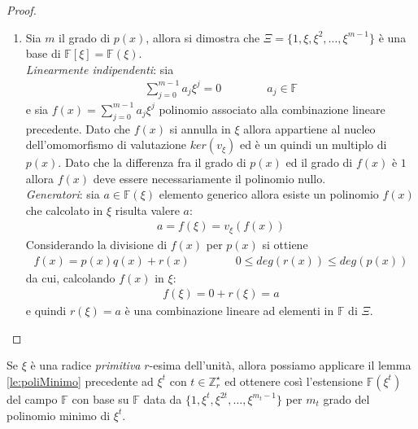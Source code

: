 \begin{proof}
\begin{enumerate}
      \item Sia $m$ il grado di $p(x)$, allora si dimostra che $\Xi = \lbrace1, \xi, \xi^2, \dots, \xi^{m-1} \rbrace$ è una base di $\mathbb{F}[\xi] = \mathbb{F}(\xi)$. \\
      \emph{Linearmente indipendenti}: sia 
      \begin{align*}
         \sum_{j=0}^{m-1} a_{j}\xi^{j} = 0 \qquad \qquad a_{j} \in \mathbb{F}
      \end{align*}
      e sia $f(x) = \sum_{j=0}^{m-1} a_{j}\xi^{j}$ polinomio associato alla combinazione lineare precedente. Dato che $f(x)$ si annulla in $\xi$ allora appartiene al nucleo dell'omomorfismo di valutazione $ker(v_{\xi})$ ed è un quindi un multiplo di $p(x)$. Dato che la differenza fra il grado di $p(x)$ ed il grado di $f(x)$ è $1$ allora $f(x)$ deve essere necessariamente il polinomio nullo. \\
      \emph{Generatori}: sia $a \in \mathbb{F}(\xi)$ elemento generico allora esiste un polinomio $f(x)$ che calcolato in $\xi$ risulta valere $a$:
      \begin{align*}
         a = f(\xi) = v_{\xi}(f(x))
      \end{align*}
      Considerando la divisione di $f(x)$ per $p(x)$ si ottiene
      \begin{align*}
         f(x) = p(x)q(x) + r(x) \qquad \qquad 0 \leq deg(r(x)) \le deg(p(x))
      \end{align*}
      da cui, calcolando $f(x)$ in $\xi$:
      \begin{align*}
         f(\xi) = 0 + r(\xi) = a
      \end{align*}
      e quindi $r(\xi) = a$ è una combinazione lineare ad elementi in $\mathbb{F}$ di $\Xi$. 
   \end{enumerate}
\end{proof}

\begin{osservazione}
   Se $\xi$ è una radice \emph{primitiva} $r$-esima dell'unità, allora possiamo applicare il lemma \ref{le:poliMinimo} precedente ad $\xi^{t}$ con $t \in \mathbb{Z}_{r}^{\star}$ ed ottenere così l'estensione $\mathbb{F}(\xi^{t})$ del campo $\mathbb{F}$ con base su $\mathbb{F}$ data da $\lbrace 1, \xi^{t}, \xi^{2t}, \dots, \xi^{m_{t} - 1} \rbrace$ per $m_{t}$ grado del polinomio minimo di $\xi^{t}$.
\end{osservazione}

